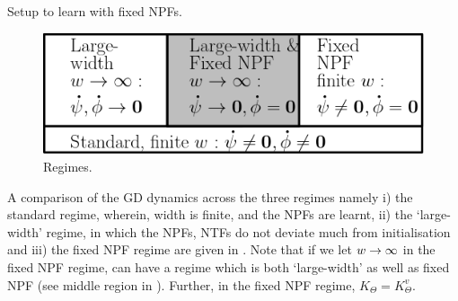 \begin{table}[h]
\begin{minipage}{0.24\columnwidth}
{}
\end{minipage}
\caption{Setup to learn with fixed NPFs.}
\label{tb:dgn}
\end{table}
\begin{figure}
\includegraphics[scale=0.25]{figs/regime.png}
\caption{\label{fig:regime} Regimes.}
\end{figure}
A comparison of the GD dynamics across the three regimes namely i) the standard regime, wherein, width is finite, and the NPFs are learnt, ii) the `large-width' regime, in which the NPFs, NTFs do not deviate much from initialisation and iii) the fixed NPF regime are given in . Note that if we let $w\rightarrow\infty$ in the fixed NPF regime, can have a regime which is both `large-width' as well as fixed NPF (see middle region in ). Further, in the fixed NPF regime, $K_{\Theta}=K^v_{\Theta}$.
\FloatBarrier
\begin{table}[h]\centering
{}
\caption{Dynamics in various regimes. Here $p\in[P], s\in[n]$.}
\label{tb:dynamics}
\end{table}
